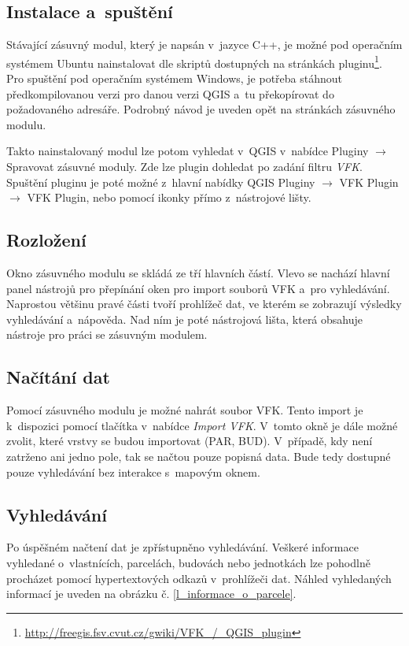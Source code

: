 \documentclass[a4paper,12pt,oneside]{book}
\begin{document}
\subsection{Instalace a~spuštění}
Stávající zásuvný modul, který je napsán v~jazyce C++, je možné pod
operačním systémem Ubuntu nainstalovat dle skriptů dostupných na
stránkách
pluginu\footnote{\url{http://freegis.fsv.cvut.cz/gwiki/VFK\_/\_QGIS\_plugin}}. Pro
spuštění pod operačním systémem Windows, je potřeba stáhnout
předkompilovanou verzi pro danou verzi QGIS a~tu překopírovat do
požadovaného adresáře. Podrobný návod je uveden opět na stránkách
zásuvného modulu.

Takto nainstalovaný modul lze potom vyhledat v~QGIS v~nabídce Pluginy
$\rightarrow$ Spravovat zásuvné moduly. Zde lze plugin dohledat po
zadání filtru \textit{VFK}. Spuštění pluginu je poté možné z~hlavní
nabídky QGIS Pluginy $\rightarrow$ VFK Plugin $\rightarrow$ VFK
Plugin, nebo pomocí ikonky přímo z~nástrojové lišty.

\subsection{Rozložení}
Okno zásuvného modulu se skládá ze tří hlavních částí. Vlevo se
nachází hlavní panel nástrojů pro přepínání oken pro import souborů
VFK a~pro vyhledávání. Naprostou většinu pravé části tvoří prohlížeč
dat, ve kterém se zobrazují výsledky vyhledávání a~nápověda. Nad ním
je poté nástrojová lišta, která obsahuje nástroje pro práci se
zásuvným modulem.

\subsection{Načítání dat}
Pomocí zásuvného modulu je možné nahrát soubor VFK. Tento import je
k~dispozici pomocí tlačítka  v~nabídce \textit{Import
  VFK}. V~tomto okně je dále možné zvolit, které vrstvy se budou
importovat (PAR, BUD). V~případě, kdy není zatrženo ani jedno pole,
tak se načtou pouze popisná data. Bude tedy dostupné pouze vyhledávání
bez interakce s~mapovým oknem.

\subsection{Vyhledávání}
Po úspěšném načtení dat je zpřístupněno vyhledávání. Veškeré informace
vyhledané o~vlastnících, parcelách, budovách nebo jednotkách lze
pohodlně procházet pomocí hypertextových odkazů v~prohlížeči
dat. Náhled vyhledaných informací je uveden na obrázku
č. \ref{l_informace_o_parcele}.
\end{document}
